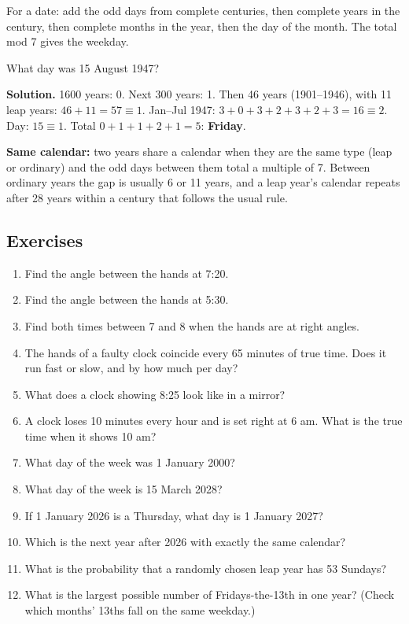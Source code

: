 \documentclass[11pt,a4paper,openany]{report}
\newenvironment{exercises}{\subsection*{Exercises \thechapter}\begin{enumerate}[label=\textbf{\thechapter.\arabic*},leftmargin=3.2em]}{\end{enumerate}}
\begin{document}
\begin{idea}[Method]
For a date: add the odd days from complete centuries, then complete years in the century, then complete months in the year, then the day of the month. The total mod 7 gives the weekday.
\end{idea}

\begin{example}
What day was 15 August 1947?

\textbf{Solution.} 1600 years: 0. Next 300 years: 1. Then 46 years (1901--1946), with 11 leap years: $46+11=57\equiv1$. Jan--Jul 1947: $3+0+3+2+3+2+3=16\equiv2$. Day: $15\equiv1$. Total $0+1+1+2+1=5$: \textbf{Friday}.
\end{example}

\textbf{Same calendar:} two years share a calendar when they are the same type (leap or ordinary) and the odd days between them total a multiple of 7. Between ordinary years the gap is usually 6 or 11 years, and a leap year's calendar repeats after 28 years within a century that follows the usual rule.

\begin{exercises}
\item Find the angle between the hands at 7:20.
\item Find the angle between the hands at 5:30.
\item Find both times between 7 and 8 when the hands are at right angles.
\item The hands of a faulty clock coincide every 65 minutes of true time. Does it run fast or slow, and by how much per day?
\item What does a clock showing 8:25 look like in a mirror?
\item A clock loses 10 minutes every hour and is set right at 6 am. What is the true time when it shows 10 am?
\item What day of the week was 1 January 2000?
\item What day of the week is 15 March 2028?
\item If 1 January 2026 is a Thursday, what day is 1 January 2027?
\item Which is the next year after 2026 with exactly the same calendar?
\item What is the probability that a randomly chosen leap year has 53 Sundays?
\item What is the largest possible number of Fridays-the-13th in one year? (Check which months' 13ths fall on the same weekday.)
\end{exercises}
\end{document}
